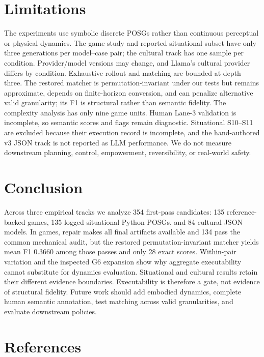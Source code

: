\documentclass{article}
\begin{document}
\section{Limitations}
The experiments use symbolic discrete POSGs rather than continuous perceptual or physical dynamics. The game study and reported situational subset have only three generations per model--case pair; the cultural track has one sample per condition. Provider/model versions may change, and Llama's cultural provider differs by condition. Exhaustive rollout and matching are bounded at depth three. The restored matcher is permutation-invariant under our tests but remains approximate, depends on finite-horizon conversion, and can penalize alternative valid granularity; its F1 is structural rather than semantic fidelity. The complexity analysis has only nine game units. Human Lane-3 validation is incomplete, so semantic scores and flags remain diagnostic. Situational S10--S11 are excluded because their execution record is incomplete, and the hand-authored v3 JSON track is not reported as LLM performance. We do not measure downstream planning, control, empowerment, reversibility, or real-world safety.

\section{Conclusion}
\label{sec:conclusion}
Across three empirical tracks we analyze 354 first-pass candidates: 135 reference-backed games, 135 logged situational Python POSGs, and 84 cultural JSON models. In games, repair makes all final artifacts available and 134 pass the common mechanical audit, but the restored permutation-invariant matcher yields mean F1 0.3660 among those passes and only 28 exact scores. Within-pair variation and the inspected G6 expansion show why aggregate executability cannot substitute for dynamics evaluation. Situational and cultural results retain their different evidence boundaries. Executability is therefore a gate, not evidence of structural fidelity. Future work should add embodied dynamics, complete human semantic annotation, test matching across valid granularities, and evaluate downstream policies.


\section{References}
\label{sec:references}

\end{document}

